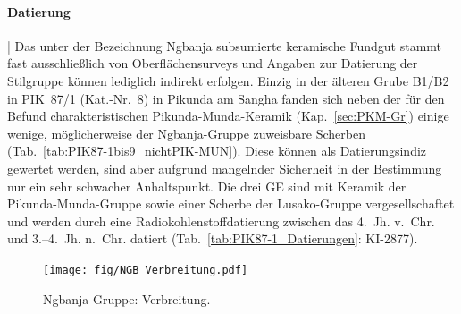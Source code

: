 \paragraph{Datierung}\hspace{-.5em}|\hspace{.5em}%
Das unter der Bezeichnung \mbox{Ngbanja} subsumierte keramische Fundgut stammt fast ausschließlich von Oberflächensurveys und Angaben zur Datierung der Stilgruppe können lediglich indirekt erfolgen. Einzig in der älteren Grube B1/B2 in PIK~87/1 (Kat.-Nr.~8) in Pikunda am \mbox{Sangha} fanden sich neben der für den Befund charakteristischen Pikunda-Munda-Keramik (Kap.~\ref{sec:PKM-Gr}) einige wenige, möglicherweise der \mbox{Ngbanja}-Gruppe zuweisbare Scherben (Tab.~\ref{tab:PIK87-1bis9_nichtPIK-MUN}). Diese können als Datierungsindiz gewertet werden, sind aber aufgrund mangelnder Sicherheit in der Bestimmung nur ein sehr schwacher Anhaltspunkt. Die drei GE sind mit Keramik der Pikunda-Munda-Gruppe sowie einer Scherbe der Lusako-Gruppe \parencite[Kap.~\ref{sec:LUS-Gr};][104--107]{Wotzka.1995} vergesellschaftet und werden durch eine Radiokohlenstoffdatierung zwischen das 4.~Jh. v.~Chr. und 3.--4.~Jh. n.~Chr. datiert (Tab.~\ref{tab:PIK87-1_Datierungen}: KI-2877).

\begin{figure}[p]
	\centering
	\texttt{[image: fig/NGB\_Verbreitung.pdf]}
	\caption{\mbox{Ngbanja}-Gruppe: Verbreitung.}
	\label{fig:NGB_Verbreitung}
\end{figure}

